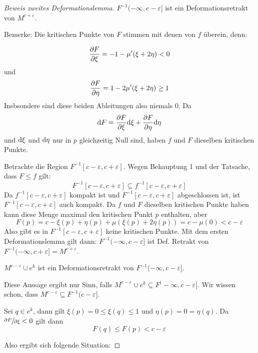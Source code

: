 \begin{proof}[Beweis zweites Deformationslemma]
     $F^{-1}(-\infty, c - \varepsilon]$ ist ein
    Deformationsretrakt von $M^{c + \varepsilon}$.

    Bemerke: Die kritischen Punkte von $F$ stimmen mit denen von $f$ überein, 
    denn:

    \[ \pderive[F]{\xi} = -1 - \mu'(\xi + 2\eta)  < 0 \]
    und
    \[ \pderive[F]{\eta} = 1 - 2 \mu'(\xi + 2\eta) \geq 1 \]
    Insbsondere sind diese beiden Ableitungen also niemals $0$. Da 
    \[ \opd F = \pderive[F]{\xi}\opd \xi + \pderive[F]{\eta} \opd \eta \]
    und ${ \operatorname{d} } \xi$ und ${ \operatorname{d} } \eta$ nur in $p$ gleichzeitig Null sind, haben $f$ 
    und $F$  dieselben kritischen Punkte.

    Betrachte die Region $F^{-1}[c - \varepsilon, c + \varepsilon]$. Wegen 
    Behauptung 1 und der Tatsache, dass $F \leq f$ gilt:
    \[ F^{-1}[c - \varepsilon, c + \varepsilon] \subseteq f^{-1}[c - \varepsilon, c + \varepsilon] \]
    Da $f^{-1}[c - \varepsilon, c + \varepsilon]$ kompakt ist und 
    $F^{-1}[c - \varepsilon, c + \varepsilon]$ abgeschlossen ist, ist 
    $F^{-1}[c - \varepsilon, c + \varepsilon]$ auch kompakt. Da $f$ und $F$
    dieselben kritischen Punkte haben kann diese Menge maximal den kritischen 
    Punkt $p$ enthalten, aber
    \[ F(p) = c - \xi(p) + \eta(p) + \mu(\xi(p) + 2\eta(p)) = c - \mu(0) < c - \varepsilon \]
    Also gibt es in $F^{-1}[c - \varepsilon, c + \varepsilon]$ keine kritischen
    Punkte. Mit dem ersten Deformationslemma gilt dann:
    $F^{-1}(- \infty, c - \varepsilon]$ ist Def. Retrakt von 
    $F^{-1}(-\infty, c + \varepsilon] = M^{c + \varepsilon}$.
    \sectiondone

     $M^{c - \varepsilon} \cup e^{k}$ ist ein 
    Deformationsretrakt von $F^{-1}(-\infty, c - \varepsilon]$.

    Diese Aussage ergibt nur Sinn, falls 
    $M^{c - \varepsilon} \cup e^{k} \subseteq F^(-\infty, c - \varepsilon]$.
    Wir wissen schon, dass $M^{c - \varepsilon} \subseteq F^{-1}(c - \varepsilon]$.

    Sei $q \in e^k$, dann gilt $\xi(p) = 0 \leq \xi(q) \leq 1$ und 
    $\eta(p) = 0 = \eta(q)$. Da 
    $\pderive[F]{\xi} < 0$ gilt dann
    \[ F(q) \leq F(p) < c - \varepsilon \]

    Also ergibt sich folgende Situation:


\end{proof}
